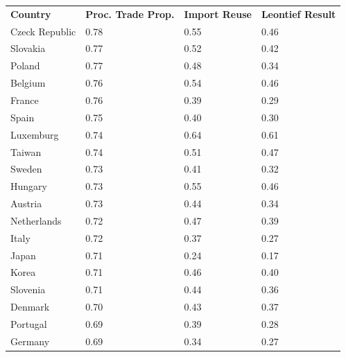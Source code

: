 \documentclass[english]{uzhpub}
\begin{document}
\begin{table}[]
\centering
\begin{tabular}{llll}
\textbf{Country}        & \textbf{Proc. Trade Prop.} & \textbf{Import Reuse} & \textbf{Leontief Result} \\
Czeck Republic & 0.78                        & 0.55                  & 0.46           \\
Slovakia       & 0.77                        & 0.52                  & 0.42           \\
Poland         & 0.77                        & 0.48                  & 0.34           \\
Belgium        & 0.76                        & 0.54                  & 0.46           \\
France         & 0.76                        & 0.39                  & 0.29           \\
Spain          & 0.75                        & 0.40                  & 0.30           \\
Luxemburg      & 0.74                        & 0.64                  & 0.61           \\
Taiwan         & 0.74                        & 0.51                  & 0.47           \\
Sweden         & 0.73                        & 0.41                  & 0.32           \\
Hungary        & 0.73                        & 0.55                  & 0.46           \\
Austria        & 0.73                        & 0.44                  & 0.34           \\
Netherlands    & 0.72                        & 0.47                  & 0.39           \\
Italy          & 0.72                        & 0.37                  & 0.27           \\
Japan          & 0.71                        & 0.24                  & 0.17           \\
Korea          & 0.71                        & 0.46                  & 0.40           \\
Slovenia       & 0.71                        & 0.44                  & 0.36           \\
Denmark        & 0.70                        & 0.43                  & 0.37           \\
Portugal       & 0.69                        & 0.39                  & 0.28           \\
Germany        & 0.69                        & 0.34                  & 0.27           \\

\end{tabular}
\end{table}
\end{document}
